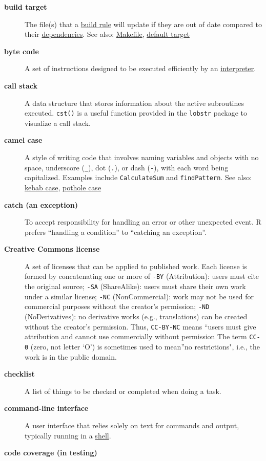 \documentclass[
]{krantz}
\begin{document}
\begin{description}
\item[\textbf{build target}]
The file(s) that a \protect\hyperlink{build_rule}{build rule} will update if they are out of date compared to their \protect\hyperlink{dependency}{dependencies}. See also: \protect\hyperlink{makefile}{Makefile}, \protect\hyperlink{default_target}{default target}
\item[\textbf{byte code}]
A set of instructions designed to be executed efficiently by an \protect\hyperlink{interpreter}{interpreter}.
\item[\textbf{call stack}]
A data structure that stores information about the active subroutines executed. \texttt{cst()} is a useful function provided in the \texttt{lobstr} package to visualize a call stack.
\item[\textbf{camel case}]
A style of writing code that involves naming variables and objects with no space, underscore (\texttt{\_}), dot (\texttt{.}), or dash (\texttt{-}), with each word being capitalized. Examples include \texttt{CalculateSum} and \texttt{findPattern}. See also: \protect\hyperlink{kebab_case}{kebab case}, \protect\hyperlink{pothole_case}{pothole case}
\item[\textbf{catch (an exception)}]
To accept responsibility for handling an error or other unexpected event. R prefers ``handling a condition'' to ``catching an exception''.
\item[\textbf{Creative Commons license}]
A set of licenses that can be applied to published work. Each license is formed by concatenating one or more of \texttt{-BY} (Attribution): users must cite the original source; \texttt{-SA} (ShareAlike): users must share their own work under a similar license; \texttt{-NC} (NonCommercial): work may not be used for commercial purposes without the creator's permission; \texttt{-ND} (NoDerivatives): no derivative works (e.g., translations) can be created without the creator's permission. Thus, \texttt{CC-BY-NC} means ``users must give attribution and cannot use commercially without permission The term \texttt{CC-0} (zero, not letter `O') is sometimes used to mean''no restrictions", i.e., the work is in the public domain.
\item[\textbf{checklist}]
A list of things to be checked or completed when doing a task.
\item[\textbf{command-line interface}]
A user interface that relies solely on text for commands and output, typically running in a \protect\hyperlink{shell}{shell}.
\item[\textbf{code coverage (in testing)}]

\end{description}
\end{document}
